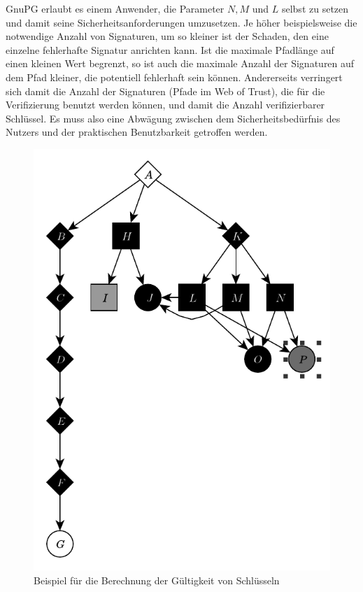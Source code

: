 GnuPG erlaubt es einem Anwender, die Parameter $N, M$ und $L$ selbst
zu setzen und damit seine Sicherheitsanforderungen umzusetzen. Je
höher beispielsweise die notwendige Anzahl von Signaturen, um so
kleiner ist der Schaden, den eine einzelne fehlerhafte Signatur
anrichten kann. Ist die maximale Pfadlänge auf einen kleinen Wert
begrenzt, so ist auch die maximale Anzahl der Signaturen auf dem Pfad
kleiner, die potentiell fehlerhaft sein können. Andererseits
verringert sich damit die Anzahl der Signaturen (Pfade im Web of
Trust), die für die Verifizierung benutzt werden können, und damit die
Anzahl verifizierbarer Schlüssel. Es muss also eine Abwägung zwischen
dem Sicherheitsbedürfnis des Nutzers und der praktischen Benutzbarkeit
getroffen werden.

\begin{figure}[t]
  \centering
  \includegraphics[scale=1.0]{images/trust-beispiel.pdf}
  \caption{Beispiel für die Berechnung der Gültigkeit von Schlüsseln}
  \label{fig:trust-beispiel}
\end{figure}

